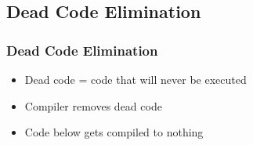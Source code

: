 \subsection{Dead Code Elimination}

\frame{\tableofcontents[currentsubsection]}

\begin{frame}
  \frametitle{Dead Code Elimination}
  \begin{itemize}
    \item Dead code = code that will never be executed
    \item Compiler removes dead code
    \item Code below gets compiled to nothing
  \end{itemize}
\end{frame}



